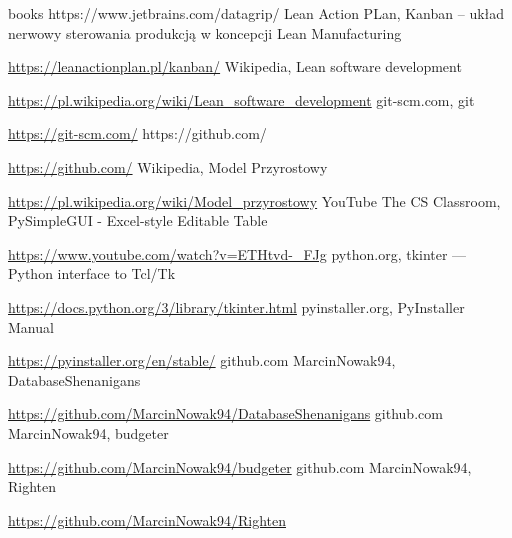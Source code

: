 \documentclass[a4paper,10pt, twoside]{report}
\begin{document}
\begin{thebibliography} {books}
{    https://www.jetbrains.com/datagrip/}
 Lean Action PLan, Kanban – układ nerwowy sterowania produkcją w koncepcji Lean Manufacturing \raggedright\url{
    https://leanactionplan.pl/kanban/}
 Wikipedia, Lean software development \raggedright\url{
    https://pl.wikipedia.org/wiki/Lean_software_development}
 git-scm.com, git \raggedright\url{
    https://git-scm.com/}
 https://github.com/ \raggedright\url{
    https://github.com/}
 Wikipedia, Model Przyrostowy \raggedright\url{
    https://pl.wikipedia.org/wiki/Model_przyrostowy}
 YouTube The CS Classroom, PySimpleGUI - Excel-style Editable Table \raggedright\url{
    https://www.youtube.com/watch?v=ETHtvd-_FJg}
 python.org, tkinter — Python interface to Tcl/Tk \raggedright\url{
    https://docs.python.org/3/library/tkinter.html}
 pyinstaller.org, PyInstaller Manual \raggedright\url{
    https://pyinstaller.org/en/stable/}
 github.com MarcinNowak94, DatabaseShenanigans \raggedright\url{
    https://github.com/MarcinNowak94/DatabaseShenanigans}
 github.com MarcinNowak94, budgeter \raggedright\url{
    https://github.com/MarcinNowak94/budgeter}
 github.com MarcinNowak94, Righten \raggedright\url{
    https://github.com/MarcinNowak94/Righten}

\end{thebibliography}

\listoffigures
\listoftables
\lstlistoflistings
\end{document}

